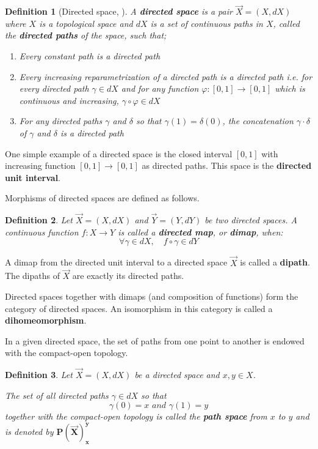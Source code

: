 \documentclass[a4paper,fleqn]{cas-sc}
\newtheorem{dfnt}{Definition}%
\begin{document}
\begin{dfnt}[Directed space, \cite{grandisbook}]
A \textbf{directed space} is a pair $\Vec{X} = (X, dX)$ where $X$ is a topological space and $dX$ is a set of continuous paths in $X$, called the \textbf{directed paths} %
of the space, such that;
\begin{enumerate}
    \item[(i)] Every constant path is a directed path
    \item[(ii)] Every increasing reparametrization of a directed path is a directed path i.e. for every directed path $\gamma \in dX$ and for any function $\varphi : [0,1] \to [0,1]$ which is continuous and increasing, $\gamma \circ \varphi \in dX$  
    \item[(iii)] For any directed paths $\gamma$ and $\delta$ so that $\gamma(1) = \delta(0)$, the concatenation $\gamma \cdot \delta$ of $\gamma$ and $\delta$ is a directed path
\end{enumerate}
\end{dfnt}

One simple example of a directed space is the closed interval $[0,1]$ with increasing function $[0,1] \to [0,1]$ as directed paths. This space is the \textbf{directed unit interval}.

Morphisms of directed spaces are defined as follows.
\begin{dfnt}
Let $\Vec{X} = (X, dX)$ and $\Vec{Y} = (Y, dY)$ be two directed spaces. A continuous function $f : X \to Y$ is called a \textbf{directed map}, or \textbf{dimap}, when:
\[\forall \gamma \in dX, \quad 
f \circ \gamma \in dY\]

\end{dfnt}
A dimap from the directed unit interval to a directed space $\Vec{X}$ is called a \textbf{dipath}. The dipaths of $\Vec{X}$ are exactly its directed paths.

Directed spaces together with dimaps (and composition of functions) form the category of directed spaces. An isomorphism in this category is called a \textbf{dihomeomorphism}. 

In a given directed space, the set of paths from one point to another is endowed with the compact-open topology.

\begin{dfnt}
Let $\Vec{X} = (X, dX)$ be a directed space and $x,y \in X$. 

The set of all directed paths $\gamma \in dX$ so that 
\[\gamma(0) = x \textit{ and } \gamma (1) = y\]
together with the compact-open topology is called the \textbf{path space} from $x$ to $y$ and is denoted by $\mathbf{P(\Vec{X})_x^y}$ 
\end{dfnt}
\end{document}
